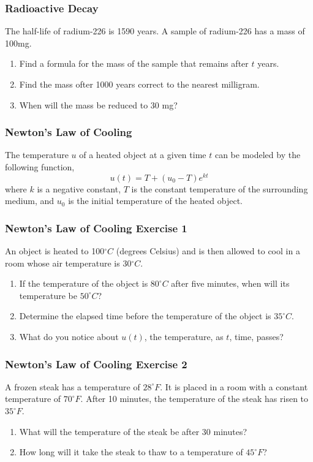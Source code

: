 \documentclass[xcolor=dvipsnames]{beamer}
\begin{document}
\begin{frame}
  \frametitle{Radioactive Decay}
The half-life of radium-226 is 1590 years. A sample of radium-226 has
a mass of 100mg. 
\begin{enumerate}
\item<1-> Find a formula for the mass of the sample that
remains after $t$ years.
\item<2-> Find the mass ofter 1000 years correct to the nearest
  milligram.
\item<3-> When will the mass be reduced to 30 mg?
\end{enumerate}
\end{frame}

\begin{frame}
  \frametitle{Newton's Law of Cooling}
The temperature $u$ of a heated object at a given time $t$ can be
modeled by the following function,
\begin{equation}
  \label{eq:iemahbec}
  u(t)=T+(u_{0}-T)e^{kt}
\end{equation}
where $k$ is a negative constant, $T$ is the constant temperature of
the surrounding medium, and $u_{0}$ is the initial temperature of the
heated object.
\end{frame}

\begin{frame}
  \frametitle{Newton's Law of Cooling Exercise 1}
An object is heated to 100$^{\circ}C$ (degrees Celsius) and is then
allowed to cool in a room whose air temperature is 30$^{\circ}C$.
\begin{enumerate}
\item<1-> If the temperature of the object is $80^{\circ}C$ after five
  minutes, when will its temperature be $50^{\circ}C$?
\item<2-> Determine the elapsed time before the temperature of the
  object is $35^{\circ}C$.
\item<3-> What do you notice about $u(t)$, the temperature, as $t$,
  time, passes?
\end{enumerate}
\end{frame}

\begin{frame}
  \frametitle{Newton's Law of Cooling Exercise 2}
A frozen steak has a temperature of $28^{\circ}F$. It is placed in a
room with a constant temperature of $70^{\circ}F$. After 10 minutes,
the temperature of the steak has risen to $35^{\circ}F$. 
\begin{enumerate}
\item<1-> What will the temperature of the steak be after 30 minutes?
\item<2-> How long will it take the steak to thaw to a temperature of $45^{\circ}F$?
\end{enumerate}
\end{frame}
\end{document}
